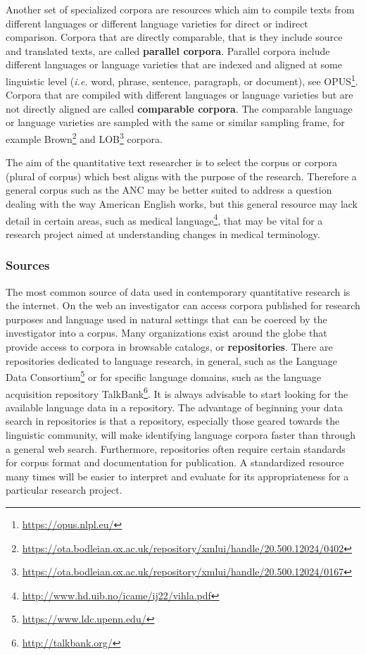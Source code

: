 \documentclass[
  letterpaper,
]{scrbook}
\DeclareRobustCommand{\href}[2]{#2\footnote{\url{#1}}}
\begin{document}
Another set of specialized corpora are resources which aim to compile
texts from different languages or different language varieties for
direct or indirect comparison. Corpora that are directly comparable,
that is they include source and translated texts, are called
\textbf{parallel corpora}. Parallel corpora include different languages
or language varieties that are indexed and aligned at some linguistic
level (\emph{i.e.} word, phrase, sentence, paragraph, or document), see
\href{https://opus.nlpl.eu/}{OPUS}. Corpora that are compiled with
different languages or language varieties but are not directly aligned
are called \textbf{comparable corpora}. The comparable language or
language varieties are sampled with the same or similar sampling frame,
for example
\href{https://ota.bodleian.ox.ac.uk/repository/xmlui/handle/20.500.12024/0402}{Brown}
and
\href{https://ota.bodleian.ox.ac.uk/repository/xmlui/handle/20.500.12024/0167}{LOB}
corpora.

The aim of the quantitative text researcher is to select the corpus or
corpora (plural of corpus) which best aligns with the purpose of the
research. Therefore a general corpus such as the ANC may be better
suited to address a question dealing with the way American English
works, but this general resource may lack detail in certain areas, such
as \href{http://www.hd.uib.no/icame/ij22/vihla.pdf}{medical language},
that may be vital for a research project aimed at understanding changes
in medical terminology.

\hypertarget{sources}{%
\subsubsection{Sources}\label{sources}}

The most common source of data used in contemporary quantitative
research is the internet. On the web an investigator can access corpora
published for research purposes and language used in natural settings
that can be coerced by the investigator into a corpus. Many
organizations exist around the globe that provide access to corpora in
browsable catalogs, or \textbf{repositories}. There are repositories
dedicated to language research, in general, such as the
\href{https://www.ldc.upenn.edu/}{Language Data Consortium} or for
specific language domains, such as the language acquisition repository
\href{http://talkbank.org/}{TalkBank}. It is always advisable to start
looking for the available language data in a repository. The advantage
of beginning your data search in repositories is that a repository,
especially those geared towards the linguistic community, will make
identifying language corpora faster than through a general web search.
Furthermore, repositories often require certain standards for corpus
format and documentation for publication. A standardized resource many
times will be easier to interpret and evaluate for its appropriateness
for a particular research project.
\end{document}
